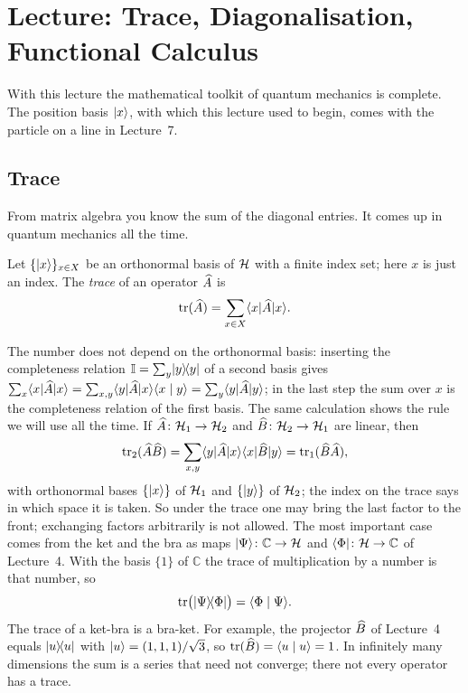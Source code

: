 
\section{Lecture: Trace, Diagonalisation, Functional Calculus}

With this lecture the mathematical toolkit of quantum mechanics is complete. The position basis $\lvert x \rangle$, with which this lecture used to begin, comes with the particle on a line in Lecture~7.

\subsection{Trace}
From matrix algebra you know the sum of the diagonal entries. It comes up in quantum mechanics all the time.
\begin{definition}
	Let $\{\lvert x \rangle\}_{x\in X}$ be an orthonormal basis of $\mathcal{H}$ with a finite index set; here $x$ is just an index. The \emph{trace} of an operator $\widehat{A}$ is
	\begin{equation}
		\operatorname{tr}(\widehat{A}) = \sum_{x\in X} \langle x \rvert \widehat{A} \lvert x \rangle.
	\end{equation}
\end{definition}
The number does not depend on the orthonormal basis: inserting the completeness relation $\mathbb{I} = \sum_y \lvert y \rangle\!\langle y \rvert$ of a second basis gives $\sum_x \langle x \rvert \widehat{A} \lvert x \rangle = \sum_{x,y} \langle y \rvert \widehat{A} \lvert x \rangle\langle x \mid y \rangle = \sum_y \langle y \rvert \widehat{A} \lvert y \rangle$; in the last step the sum over $x$ is the completeness relation of the first basis. The same calculation shows the rule we will use all the time. If $\widehat{A}\colon \mathcal{H}_1 \to \mathcal{H}_2$ and $\widehat{B}\colon \mathcal{H}_2 \to \mathcal{H}_1$ are linear, then
\begin{equation}
	\operatorname{tr}_2(\widehat{A}\widehat{B}) = \sum_{x,y} \langle y \rvert \widehat{A} \lvert x \rangle\langle x \rvert \widehat{B} \lvert y \rangle = \operatorname{tr}_1(\widehat{B}\widehat{A}),
\end{equation}
with orthonormal bases $\{\lvert x \rangle\}$ of $\mathcal{H}_1$ and $\{\lvert y \rangle\}$ of $\mathcal{H}_2$; the index on the trace says in which space it is taken. So under the trace one may bring the last factor to the front; exchanging factors arbitrarily is not allowed. The most important case comes from the ket and the bra as maps $\lvert \Psi \rangle\colon\mathbb{C}\to\mathcal{H}$ and $\langle \Phi \rvert\colon\mathcal{H}\to\mathbb{C}$ of Lecture~4. With the basis $\{1\}$ of $\mathbb{C}$ the trace of multiplication by a number is that number, so
\begin{equation}
	\operatorname{tr}\bigl(\lvert \Psi \rangle\!\langle \Phi \rvert\bigr) = \langle \Phi \mid \Psi \rangle.
\end{equation}
The trace of a ket-bra is a bra-ket. For example, the projector $\widehat{B}$ of Lecture~4 equals $\lvert u \rangle\!\langle u \rvert$ with $\lvert u \rangle = (1,1,1)/\sqrt{3}$, so $\operatorname{tr}(\widehat{B}) = \langle u \mid u \rangle = 1$. In infinitely many dimensions the sum is a series that need not converge; there not every operator has a trace.


